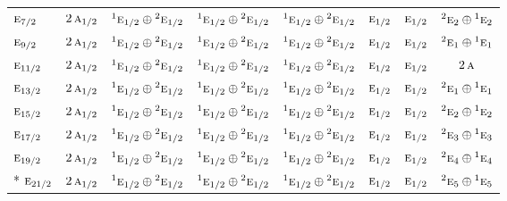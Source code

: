 \documentclass[10pt,a4paper]{article}
\numberwithin{equation}{section}
\newcommand{\irr}[1]{\text{\normalfont\scshape #1}}
\newcommand{\conjpair}[1]{{}^{#1}}
\begin{document}
{\begin{longtable}{@{}lccccccc@{}}
$\irr{e}_{7/2}$ & $2\,\irr{a}_{1/2}$ & $\conjpair{1}\irr{e}_{1/2}\oplus \conjpair{2}\irr{e}_{1/2}$ & $\conjpair{1}\irr{e}_{1/2}\oplus \conjpair{2}\irr{e}_{1/2}$ & $\conjpair{1}\irr{e}_{1/2}\oplus \conjpair{2}\irr{e}_{1/2}$ & $\irr{e}_{1/2}$ & $\irr{e}_{1/2}$ & $\conjpair{2}\irr{e}_{2}\oplus \conjpair{1}\irr{e}_{2}$\\
$\irr{e}_{9/2}$ & $2\,\irr{a}_{1/2}$ & $\conjpair{1}\irr{e}_{1/2}\oplus \conjpair{2}\irr{e}_{1/2}$ & $\conjpair{1}\irr{e}_{1/2}\oplus \conjpair{2}\irr{e}_{1/2}$ & $\conjpair{1}\irr{e}_{1/2}\oplus \conjpair{2}\irr{e}_{1/2}$ & $\irr{e}_{1/2}$ & $\irr{e}_{1/2}$ & $\conjpair{2}\irr{e}_{1}\oplus \conjpair{1}\irr{e}_{1}$\\
$\irr{e}_{11/2}$ & $2\,\irr{a}_{1/2}$ & $\conjpair{1}\irr{e}_{1/2}\oplus \conjpair{2}\irr{e}_{1/2}$ & $\conjpair{1}\irr{e}_{1/2}\oplus \conjpair{2}\irr{e}_{1/2}$ & $\conjpair{1}\irr{e}_{1/2}\oplus \conjpair{2}\irr{e}_{1/2}$ & $\irr{e}_{1/2}$ & $\irr{e}_{1/2}$ & $2\,\irr{a}$\\
$\irr{e}_{13/2}$ & $2\,\irr{a}_{1/2}$ & $\conjpair{1}\irr{e}_{1/2}\oplus \conjpair{2}\irr{e}_{1/2}$ & $\conjpair{1}\irr{e}_{1/2}\oplus \conjpair{2}\irr{e}_{1/2}$ & $\conjpair{1}\irr{e}_{1/2}\oplus \conjpair{2}\irr{e}_{1/2}$ & $\irr{e}_{1/2}$ & $\irr{e}_{1/2}$ & $\conjpair{2}\irr{e}_{1}\oplus \conjpair{1}\irr{e}_{1}$\\
$\irr{e}_{15/2}$ & $2\,\irr{a}_{1/2}$ & $\conjpair{1}\irr{e}_{1/2}\oplus \conjpair{2}\irr{e}_{1/2}$ & $\conjpair{1}\irr{e}_{1/2}\oplus \conjpair{2}\irr{e}_{1/2}$ & $\conjpair{1}\irr{e}_{1/2}\oplus \conjpair{2}\irr{e}_{1/2}$ & $\irr{e}_{1/2}$ & $\irr{e}_{1/2}$ & $\conjpair{2}\irr{e}_{2}\oplus \conjpair{1}\irr{e}_{2}$\\
$\irr{e}_{17/2}$ & $2\,\irr{a}_{1/2}$ & $\conjpair{1}\irr{e}_{1/2}\oplus \conjpair{2}\irr{e}_{1/2}$ & $\conjpair{1}\irr{e}_{1/2}\oplus \conjpair{2}\irr{e}_{1/2}$ & $\conjpair{1}\irr{e}_{1/2}\oplus \conjpair{2}\irr{e}_{1/2}$ & $\irr{e}_{1/2}$ & $\irr{e}_{1/2}$ & $\conjpair{2}\irr{e}_{3}\oplus \conjpair{1}\irr{e}_{3}$\\
$\irr{e}_{19/2}$ & $2\,\irr{a}_{1/2}$ & $\conjpair{1}\irr{e}_{1/2}\oplus \conjpair{2}\irr{e}_{1/2}$ & $\conjpair{1}\irr{e}_{1/2}\oplus \conjpair{2}\irr{e}_{1/2}$ & $\conjpair{1}\irr{e}_{1/2}\oplus \conjpair{2}\irr{e}_{1/2}$ & $\irr{e}_{1/2}$ & $\irr{e}_{1/2}$ & $\conjpair{2}\irr{e}_{4}\oplus \conjpair{1}\irr{e}_{4}$\\*
$\irr{e}_{21/2}$ & $2\,\irr{a}_{1/2}$ & $\conjpair{1}\irr{e}_{1/2}\oplus \conjpair{2}\irr{e}_{1/2}$ & $\conjpair{1}\irr{e}_{1/2}\oplus \conjpair{2}\irr{e}_{1/2}$ & $\conjpair{1}\irr{e}_{1/2}\oplus \conjpair{2}\irr{e}_{1/2}$ & $\irr{e}_{1/2}$ & $\irr{e}_{1/2}$ & $\conjpair{2}\irr{e}_{5}\oplus \conjpair{1}\irr{e}_{5}$\\
\bottomrule\end{longtable}}
\end{document}
